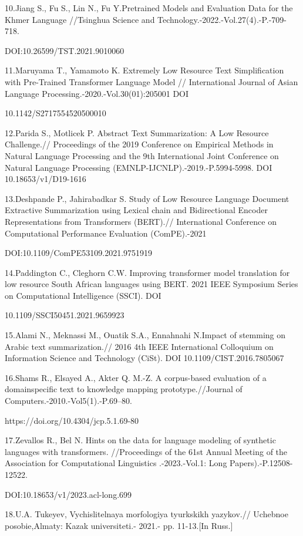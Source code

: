 \begin{noparindent}
10.Jiang S., Fu S., Lin N., Fu Y.Pretrained Models and Evaluation Data
for the Khmer Language //Tsinghua Science and
Technology.-2022.-Vol.27(4).-P.-709-718.

DOI:10.26599/TST.2021.9010060

11.Maruyama T., Yamamoto K. Extremely Low Resource Text Simplification
with Pre-Trained Transformer Language Model // International Journal of
Asian Language Processing.-2020.-Vol.30(01):205001 DOI

10.1142/S2717554520500010

12.Parida S., Motlicek P. Abstract Text Summarization: A Low Resource
Challenge.// Proceedings of the 2019 Conference on Empirical Methods in
Natural Language Processing and the 9th International Joint Conference
on Natural Language Processing (EMNLP-IJCNLP).-2019.-P.5994-5998. DOI
10.18653/v1/D19-1616

13.Deshpande P., Jahirabadkar S. Study of Low Resource Language Document
Extractive Summarization using Lexical chain and Bidirectional Encoder
Representations from Transformers (BERT).// International Conference on
Computational Performance Evaluation (ComPE).-2021

DOI:10.1109/ComPE53109.2021.9751919

14.Paddington C., Cleghorn C.W. Improving transformer model translation
for low resource South African languages using BERT. 2021 IEEE Symposium
Series on Computational Intelligence (SSCI). DOI

10.1109/SSCI50451.2021.9659923

15.Alami N., Meknassi M., Ouatik S.A., Ennahnahi N.Impact of stemming on
Arabic text summarization.// 2016 4th IEEE International Colloquium on
Information Science and Technology (CiSt). DOI 10.1109/CIST.2016.7805067

16.Shams R., Elsayed A., Akter Q. M.-Z. A corpus-based evaluation of a
domainspecific text to knowledge mapping prototype.//Journal of
Computers.-2010.-Vol5(1).-P.69--80.

https://doi.org/10.4304/jcp.5.1.69-80

17.Zevallos R., Bel N. Hints on the data for language modeling of
synthetic languages with transformers. //Proceedings of the 61st Annual
Meeting of the Association for Computational Linguistics .-2023.-Vol.1:
Long Papers).-P.12508-12522.

DOI:10.18653/v1/2023.acl-long.699

18.U.A. Tukeyev, Vychislitelnaya morfologiya tyurkskikh yazykov.//
Uchebnoe posobie,Almaty: Kazak universiteti.- 2021.- pp. 11-13.{[}In
Russ.{]}


\end{noparindent}
